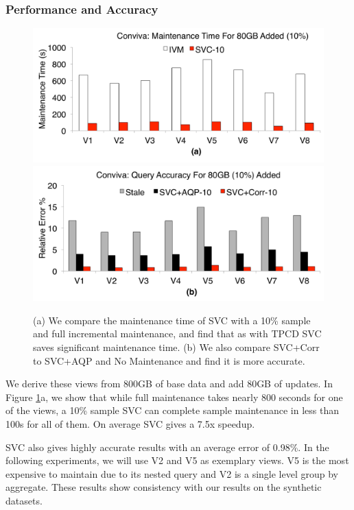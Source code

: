 \subsubsection{Performance and Accuracy}
\begin{figure}[t]
\centering
 \includegraphics[scale=0.10]{exp/con_3.pdf}
 \includegraphics[scale=0.10]{exp/con_4.pdf}
 \caption{(a) We compare the maintenance time of SVC with a 10\% sample and full incremental maintenance, and find that as with TPCD SVC saves significant maintenance time. (b) We also compare SVC+Corr to SVC+AQP and No Maintenance and find it is more accurate. \label{conv-1}}
\end{figure}
We derive these views from 800GB of base data and add 80GB of updates.
In Figure \ref{conv-1}a, we show that while full maintenance takes nearly 800 seconds for one of the views, a 10\% sample SVC can complete sample maintenance in less than 100s for all of them.
On average SVC gives a 7.5x speedup.

SVC also gives highly accurate results with an average error of 0.98\%.
In the following experiments, we will use V2 and V5 as exemplary views.
V5 is the most expensive to maintain due to its nested query and V2 is a single level group by aggregate.
These results show consistency with our results on the synthetic datasets.

